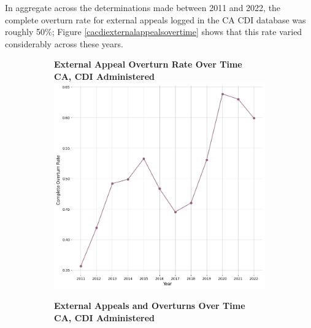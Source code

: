 \documentclass[12pt, a4paper,twoside,parskip=full]{report}
\theoremstyle{plain} %
\theoremstyle{definition} %
\theoremstyle{remark} %
\numberwithin{equation}{chapter}
\begin{document}
		In aggregate across the determinations made between 2011 and 2022, the complete overturn rate for external appeals logged in the CA CDI database was roughly 50\%; Figure \ref{cacdiexternalappealsovertime} shows that this rate varied considerably across these years.
		
		
		\begin{figure}[h!]
			\centering
			\begin{subfigure}[b]{0.49\textwidth}
				\centering
				\textbf{External Appeal Overturn Rate Over Time}\\
				\textbf{CA, CDI Administered}\\
				\includegraphics[width=\textwidth]{images/ca_doi_external_appeals/external_appeal_overturn_rates_by_year.png}
			\end{subfigure}
			\hfill
			\begin{subfigure}[b]{0.49\textwidth}
				\centering
				\textbf{External Appeals and Overturns Over Time}\\
				\textbf{CA, CDI Administered}\\

\end{subfigure}
\end{figure}
\end{document}
